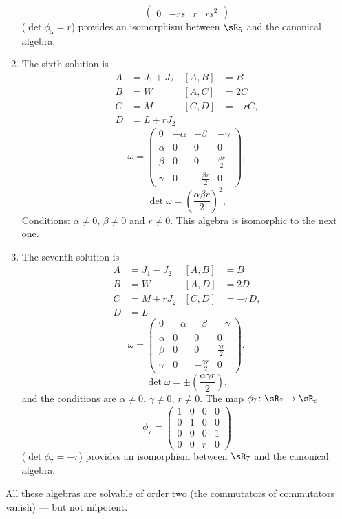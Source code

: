 \begin{enumerate}
\begin{equation}
\begin{pmatrix}
0&-rs&r&rs^{2}
\end{pmatrix}
\end{equation}
($\det\phi_{5}=r$) provides an isomorphism between $\sR_{5}$ and the canonical algebra.
\item The sixth solution is
\begin{align*}
A&=J_{1}+J_{2}		&[A,B]&=B\\
B&=W			&[A,C]&=2C\\
C&=M			&[C,D]&=-rC,\\
D&=L+rJ_{2}		
\end{align*}
\begin{equation}
\omega=\begin{pmatrix}
0	&-\alpha		&-\beta	&-\gamma\\
\alpha	&0			&0	&0\\
\beta	&0			&0	&\frac{ \beta r }{2}\\
\gamma	&0			&-\frac{ \beta r }{2}	&0
\end{pmatrix},
\end{equation}
\begin{equation}
\det\omega=\left( \frac{ \alpha\beta r }{ 2 } \right)^2,
\end{equation}
Conditions: $\alpha\neq 0$, $\beta\neq 0$ and $r\neq 0$. This algebra is isomorphic to the next one.
\item The seventh solution is
\begin{align*}
A&=J_{1}-J_{2}		&[A,B]&=B\\
B&=W			&[A,D]&=2D\\
C&=M+rJ_{2}		&[C,D]&=-rD,\\
D&=L		
\end{align*}
\begin{equation}
\omega=\begin{pmatrix}
0	&-\alpha		&-\beta	&-\gamma\\
\alpha	&0			&0	&0\\
\beta	&0			&0	&\frac{ \gamma r }{2}\\
\gamma	&0			&-\frac{ \gamma r }{2}	&0
\end{pmatrix},
\end{equation}
\begin{equation}
\det\omega=\pm\left( \frac{ \alpha\gamma r }{ 2 } \right),
\end{equation}
and the conditions are $\alpha\neq 0$, $\gamma\neq 0$, $r\neq 0$.  The map $\phi_7\colon \sR_7\to \sR_c$
\[
  \phi_{7}=
\begin{pmatrix}
1&0&0&0\\
0&1&0&0\\
0&0&0&1\\
0&0&r&0
\end{pmatrix}
\]
($\det\phi_{7}=-r$) provides an isomorphism between $\sR_{7}$ and the canonical algebra.
\end{enumerate}
\let\ANCtheenumi\theenumi
All these algebras are solvable of order two (the commutators of commutators vanish) --- but not nilpotent.

